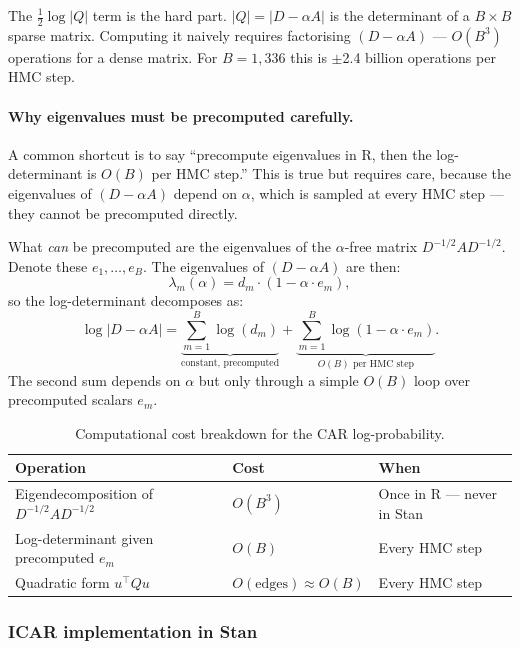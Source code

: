 \documentclass[12pt,a4paper]{article}
\begin{document}
The $\frac{1}{2}\log|Q|$ term is the hard part. $|Q| = |D - \alpha A|$ is the determinant of a $B \times B$ sparse matrix. Computing it naively requires factorising $(D - \alpha A)$ — $O(B^3)$ operations for a dense matrix. For $B = 1{,}336$ this is $\pm$2.4 billion operations per HMC step.

\paragraph{Why eigenvalues must be precomputed carefully.}
A common shortcut is to say ``precompute eigenvalues in R, then the log-determinant is $O(B)$ per HMC step.'' This is true but requires care, because the eigenvalues of $(D - \alpha A)$ depend on $\alpha$, which is sampled at every HMC step — they cannot be precomputed directly.

What \emph{can} be precomputed are the eigenvalues of the $\alpha$-free matrix $D^{-1/2} A D^{-1/2}$. Denote these $e_1, \ldots, e_B$. The eigenvalues of $(D - \alpha A)$ are then:
\begin{equation}
  \lambda_m(\alpha) = d_m \cdot (1 - \alpha \cdot e_m),
\end{equation}
so the log-determinant decomposes as:
\begin{equation}
  \log|D - \alpha A| = \underbrace{\sum_{m=1}^B \log(d_m)}_{\text{constant, precomputed}} + \underbrace{\sum_{m=1}^B \log(1 - \alpha \cdot e_m)}_{O(B) \text{ per HMC step}}.
\end{equation}
The second sum depends on $\alpha$ but only through a simple $O(B)$ loop over precomputed scalars $e_m$.

\begin{table}[ht]
\centering
\small
\begin{tabular}{lll}
\toprule
Operation & Cost & When \\
\midrule
Eigendecomposition of $D^{-1/2}AD^{-1/2}$ & $O(B^3)$ & Once in R --- never in Stan \\
Log-determinant given precomputed $e_m$ & $O(B)$ & Every HMC step \\
Quadratic form $u^\top Q u$ & $O(\text{edges}) \approx O(B)$ & Every HMC step \\
\bottomrule
\end{tabular}
\caption{Computational cost breakdown for the CAR log-probability.}
\end{table}

\subsubsection{ICAR implementation in Stan}
\end{document}
